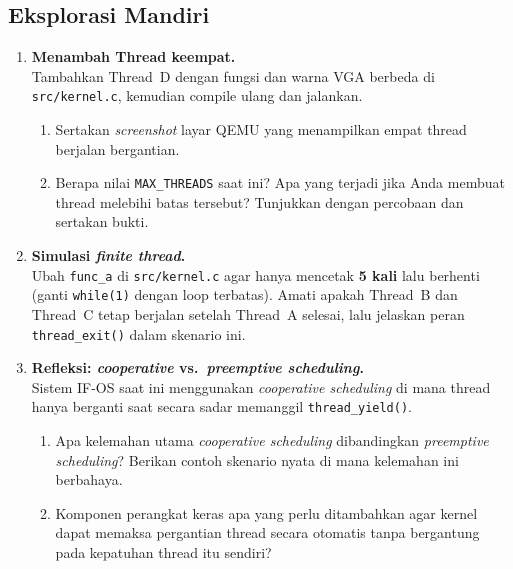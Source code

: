 \subsection{Eksplorasi Mandiri}

\begin{enumerate}

	\item \textbf{Menambah Thread keempat.}\\
	      Tambahkan Thread~D dengan fungsi dan warna VGA berbeda di
	      \texttt{src/kernel.c}, kemudian compile ulang dan jalankan.

	      \begin{enumerate}
		      \item[(a)] Sertakan \textit{screenshot} layar QEMU yang
		            menampilkan empat thread berjalan bergantian.


		      \item[(b)] Berapa nilai \texttt{MAX\_THREADS} saat ini?
		            Apa yang terjadi jika Anda membuat thread melebihi
		            batas tersebut? Tunjukkan dengan percobaan dan
		            sertakan bukti.
	      \end{enumerate}

	\item \textbf{Simulasi \textit{finite thread}.}\\
	      Ubah \texttt{func\_a} di \texttt{src/kernel.c} agar hanya
	      mencetak \textbf{5 kali} lalu berhenti (ganti \texttt{while(1)}
	      dengan loop terbatas). Amati apakah Thread~B dan Thread~C tetap
	      berjalan setelah Thread~A selesai, lalu jelaskan peran
	      \texttt{thread\_exit()} dalam skenario ini.

	\item \textbf{Refleksi: \textit{cooperative} vs.\
		      \textit{preemptive scheduling}.}\\
	      Sistem IF-OS saat ini menggunakan \textit{cooperative scheduling}
	      di mana thread hanya berganti saat secara sadar memanggil
	      \texttt{thread\_yield()}.

	      \begin{enumerate}
		      \item[(a)] Apa kelemahan utama \textit{cooperative scheduling}
		            dibandingkan \textit{preemptive scheduling}?
		            Berikan contoh skenario nyata di mana kelemahan
		            ini berbahaya.

		      \item[(b)] Komponen perangkat keras apa yang perlu ditambahkan
		            agar kernel dapat memaksa pergantian thread secara
		            otomatis tanpa bergantung pada kepatuhan thread
		            itu sendiri?
	      \end{enumerate}

\end{enumerate}
